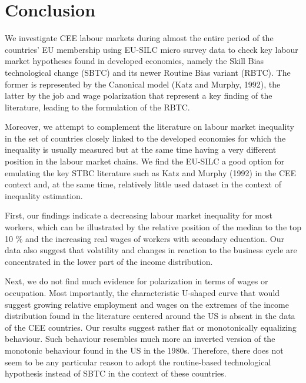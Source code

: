 \documentclass[11pt]{article}
\begin{document}

\section{Conclusion}
We investigate CEE labour markets during almost the entire period of the countries' EU membership using EU-SILC micro survey data to check key labour market hypotheses found in developed economies, namely the Skill Bias technological change (SBTC) and its newer Routine Bias variant (RBTC). The former is represented by the Canonical model (Katz and Murphy, 1992), the latter by the job and wage polarization that represent a key finding of the literature, leading to the formulation of the RBTC.

Moreover, we attempt to complement the literature on labour market inequality in the set of countries closely linked to the developed economies for which the inequality is usually measured but at the same time having a very different position in the labour market chains. We find the EU-SILC a good option for emulating the key STBC literature such as Katz and Murphy (1992) in the CEE context and, at the same time, relatively little used dataset in the context of inequality estimation.

First, our findings indicate a decreasing labour market inequality for most workers, which can be illustrated by the relative position of the median to the top 10 \% and the increasing real wages of workers with secondary education. Our data also suggest that volatility and changes in reaction to the business cycle are concentrated in the lower part of the income distribution.

Next, we do not find much evidence for polarization in terms of wages or occupation. Most importantly, the characteristic U-shaped curve that would suggest growing relative employment and wages on the extremes of the income distribution found in the literature centered around the US is absent in the data of the CEE countries. Our results suggest rather flat or monotonically equalizing behaviour. Such behaviour resembles much more an inverted version of the monotonic behaviour found in the US in the 1980s. Therefore, there does not seem to be any particular reason to adopt the routine-based technological hypothesis instead of SBTC in the context of these countries.
\end{document}
